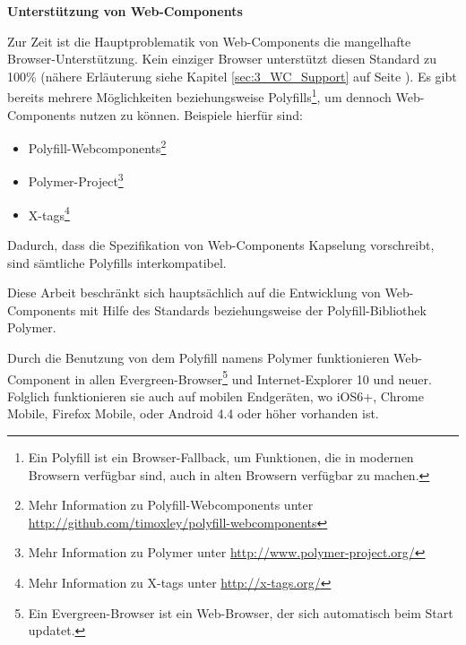 \textbf{Unterstützung von Web-Components}

Zur Zeit ist die Hauptproblematik von Web-Components die mangelhafte Browser-Unterstützung. Kein einziger Browser unterstützt diesen Standard zu 100\% (nähere Erläuterung siehe Kapitel \ref{sec:3_WC_Support} auf Seite \pageref{sec:3_WC_Support}). Es gibt bereits mehrere Möglichkeiten beziehungsweise Polyfills\footnote{Ein Polyfill ist ein Browser-Fallback, um Funktionen, die in modernen Browsern verfügbar sind, auch in alten Browsern verfügbar zu machen.}, um dennoch Web-Components nutzen zu können. Beispiele hierfür sind:
\begin{itemize}
\item Polyfill-Webcomponents\footnote{Mehr Information zu Polyfill-Webcomponents unter \href{http://github.com/timoxley/polyfill-webcomponents}{http://github.com/timoxley/polyfill-webcomponents}}
\item Polymer-Project\footnote{Mehr Information zu Polymer unter \href{http://www.polymer-project.org/}{http://www.polymer-project.org/}}
\item X-tags\footnote{Mehr Information zu X-tags unter \href{http://x-tags.org/}{http://x-tags.org/}}
\end{itemize}

Dadurch, dass die Spezifikation von Web-Components Kapselung vorschreibt, sind sämtliche Polyfills interkompatibel.

Diese Arbeit beschränkt sich hauptsächlich auf die Entwicklung von Web-Components mit Hilfe des Standards beziehungsweise der Polyfill-Bibliothek Polymer.

Durch die Benutzung von dem Polyfill namens Polymer funktionieren Web-Component in allen \glqq Evergreen\grqq -Browser\footnote{Ein \glqq Evergreen\grqq -Browser ist ein Web-Browser, der sich automatisch beim Start updatet.} und Internet-Explorer 10 und neuer. Folglich funktionieren sie auch auf mobilen Endgeräten, wo iOS6+, Chrome Mobile, Firefox Mobile, oder Android 4.4 oder höher vorhanden ist.
